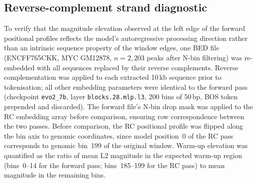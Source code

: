 \subsection{Reverse-complement strand diagnostic}
\label{sec:revcomp}

To verify that the magnitude elevation observed at the left edge of the
forward positional profiles reflects the model's autoregressive processing
direction rather than an intrinsic sequence property of the window edges, one BED file
(ENCFF765CKK, MYC GM12878, $n = 2{,}203$ peaks after N-bin filtering) was
re-embedded with all sequences replaced by their reverse complements.
Reverse complementation was applied to each extracted 10\,kb sequence prior to
tokenisation; all other embedding parameters were identical to the forward pass
(checkpoint \texttt{evo2\_7b}, layer \texttt{blocks.28.mlp.l3}, 200 bins of
50\,bp, BOS token prepended and discarded).
The forward file's N-bin drop mask was applied to the RC embedding array before
comparison, ensuring row correspondence between the two passes.
Before comparison, the RC positional profile was flipped along the bin axis to
genomic coordinates, since model position~0 of the RC pass corresponds to
genomic bin~199 of the original window.
Warm-up elevation was quantified as the ratio of mean L2 magnitude in the
expected warm-up region (bins~0--14 for the forward pass; bins~185--199 for the
RC pass) to mean magnitude in the remaining bins.

\shorthandon{-} 

